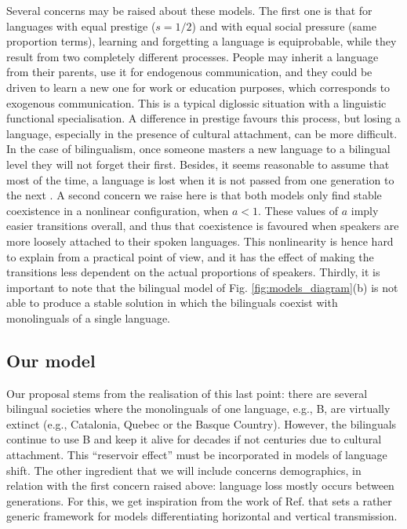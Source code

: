 \documentclass[../thesis.tex]{subfiles}
\begin{document}
Several concerns may be raised about these models. The first one is that for languages
with equal prestige ($s=1/2$) and with equal social pressure (same proportion terms),
learning and forgetting a language is equiprobable, while they result from two
completely different processes. People may inherit a language from their parents, use it
for endogenous communication, and they could be driven to learn a new one for work or
education purposes, which corresponds to exogenous communication. This is a typical
diglossic situation \cite{FergusonDiglossia1959} with a linguistic functional
specialisation. A difference in prestige favours this process, but losing a language,
especially in the presence of cultural attachment, can be more difficult. In the case of
bilingualism, once someone masters a new language to a bilingual level they will not
forget their first. Besides, it seems reasonable to assume that most of the time, a
language is lost when it is not passed from one generation to the next
\cite{CrystalLanguageDeath2000,PortesPluribusUnum1998}. A second concern we raise here
is that both models only find stable coexistence in a nonlinear configuration, when $a <
1$. These values of $a$ imply easier transitions overall, and thus that coexistence is
favoured when speakers are more loosely attached to their spoken languages. This
nonlinearity is hence hard to explain from a practical point of view, and it has the
effect of making the transitions less dependent on the actual proportions of speakers.
Thirdly, it is important to note that the bilingual model of Fig.
\ref{fig:models_diagram}(b) is not able to produce a stable solution in which the
bilinguals coexist with monolinguals of a single language.


\subsection{Our model}
Our proposal stems from the realisation of this last point: there are several bilingual
societies where the monolinguals of one language, e.g., B, are virtually extinct (e.g.,
Catalonia, Quebec or the Basque Country). However, the bilinguals continue to use B and
keep it alive for decades if not centuries due to cultural attachment. This ``reservoir
effect'' must be incorporated in models of language shift. The other ingredient that we
will include concerns demographics, in relation with the first concern raised above:
language loss mostly occurs between generations. For this, we get inspiration from the
work of Ref. \cite{MinettModellingEndangered2008} that sets a rather generic framework
for models differentiating horizontal and vertical transmission.
\end{document}

